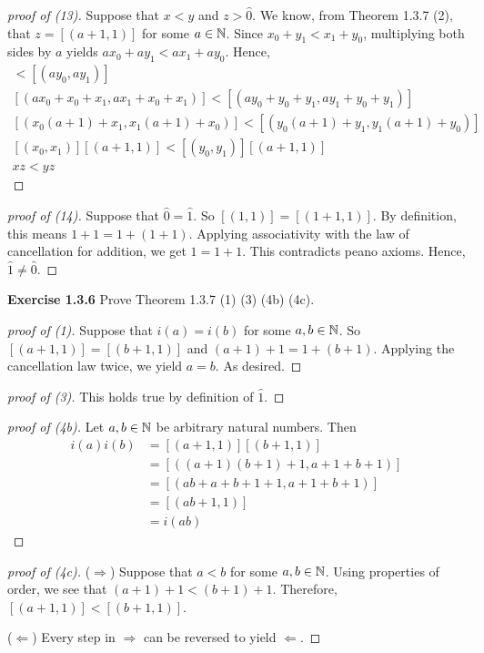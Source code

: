 \begin{proof}[proof of (13)]
    Suppose that \(x < y\) and \(z > \hat{0}\). We know, from Theorem 1.3.7 (2), that \(z = [(a+1, 1)]\) for some \(a \in \mathbb{N}\).
    Since \(x_0 + y_1 < x_1 + y_0\), multiplying both sides by \(a\) yields \(ax_0 + ay_1 < ax_1 + ay_0\).
    Hence,
    \begin{gather*}
        [(ax_0, ax_1)] < [(ay_0, ay_1)] \\
        [(ax_0 + x_0 + x_1, ax_1 + x_0 + x_1)] < [(ay_0 + y_0 + y_1, ay_1 + y_0 + y_1)]\\
        [(x_0(a+1)+x_1, x_1(a+1) + x_0)] < [(y_0(a+1) + y_1, y_1(a+1) + y_0)] \\
        [(x_0, x_1)][(a+1, 1)] < [(y_0, y_1)][(a+1, 1)]\\
        xz < yz
    \end{gather*}
\end{proof}
\begin{proof}[proof of (14)]
    Suppose that \(\hat{0} = \hat{1}\). So \([(1,1)] = [(1+1, 1)]\). By definition, this means \(1 + 1 = 1 + (1+1)\). Applying associativity with the law of cancellation for addition, we get \(1 = 1+ 1\). This contradicts peano axioms. Hence, \(\hat{1} \neq \hat{0}\).
\end{proof}


\newpage

\noindent \textbf{Exercise 1.3.6} Prove Theorem 1.3.7 (1) (3) (4b) (4c).
\begin{proof}[proof of (1)]
    Suppose that \(i(a) = i(b)\) for some \(a,b \in \mathbb{N}\). So \([(a+1,1)] = [(b+1, 1)]\) and \((a+1) + 1 = 1 + (b+1)\). Applying the cancellation law twice, we yield \(a=b\). As desired.
\end{proof}
\begin{proof}[proof of (3)]
    This holds true by definition of \(\hat{1}\).
\end{proof}
\begin{proof}[proof of (4b)]
    Let \(a,b \in \mathbb{N}\) be arbitrary natural numbers. Then
    \begin{align*}
        i(a)i(b) &= [(a+1, 1)][(b+1, 1)]\\
        &= [((a+1)(b+1) + 1, a+1 + b+1)]\\
        &= [(ab + a + b + 1 + 1, a+1 +  b + 1)]\\
        &= [(ab + 1, 1)] \\
        &= i(ab)
    \end{align*}
\end{proof}
\begin{proof}[proof of (4c)]
    (\(\Longrightarrow\)) Suppose that \(a<b\) for some \(a,b \in \mathbb{N}\). Using properties of order, we see that \((a+1) +1 < (b+1) + 1\).
    Therefore, \([(a+1, 1)] < [(b+1, 1)]\).
    \par (\(\Longleftarrow\)) Every step in \(\Longrightarrow\) can be reversed to yield \(\Longleftarrow\).
\end{proof}


